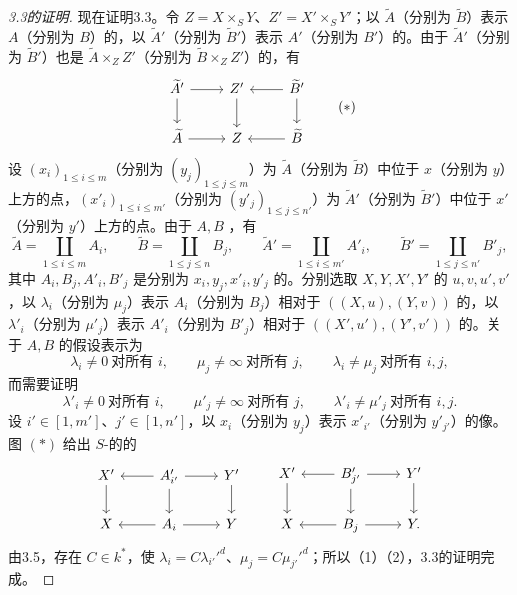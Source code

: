 \begin{proof}[3.3的证明]
现在证明3.3。令 $Z=X\times_S Y$、$Z'=X'\times_S Y'$；以 $\widetilde A$（分别为 $\widetilde B$）表示 $A$（分别为 $B$）的，以 $\widetilde A'$（分别为 $\widetilde B'$）表示 $A'$（分别为 $B'$）的。由于 $\widetilde A'$（分别为 $\widetilde B'$）也是 $\widetilde A\times_Z Z'$（分别为 $\widetilde B\times_Z Z'$）的，有
\[
\begin{tikzcd}
 \widetilde A'\arrow[r]\arrow[d]&Z'\arrow[d]&\widetilde B'\arrow[l]\arrow[d]\\
 \widetilde A\arrow[r]&Z&\widetilde B\arrow[l]
\end{tikzcd}\tag{$*$}
\]
设 $(x_i)_{1\leq i\leq m}$（分别为 $(y_j)_{1\leq j\leq m}$）为 $\widetilde A$（分别为 $\widetilde B$）中位于 $x$（分别为 $y$）上方的点，$(x'_i)_{1\leq i\leq m'}$（分别为 $(y'_j)_{1\leq j\leq n'}$）为 $\widetilde A'$（分别为 $\widetilde B'$）中位于 $x'$（分别为 $y'$）上方的点。由于 $A,B$ ，有
\[
 \widetilde A=\coprod_{1\leq i\leq m}A_i,\qquad
 \widetilde B=\coprod_{1\leq j\leq n}B_j,\qquad
 \widetilde A'=\coprod_{1\leq i\leq m'}A'_i,\qquad
 \widetilde B'=\coprod_{1\leq j\leq n'}B'_j,
\]
其中 $A_i,B_j,A'_i,B'_j$ 是分别为 $x_i,y_j,x'_i,y'_j$ 的。分别选取 $X,Y,X',Y'$ 的 $u,v,u',v'$，以 $\lambda_i$（分别为 $\mu_j$）表示 $A_i$（分别为 $B_j$）相对于 $((X,u),(Y,v))$ 的，以 $\lambda'_i$（分别为 $\mu'_j$）表示 $A'_i$（分别为 $B'_j$）相对于 $((X',u'),(Y',v'))$ 的。关于 $A,B$ 的假设表示为
\[
 \lambda_i\ne0\ \text{对所有 }i,\qquad
 \mu_j\ne\infty\ \text{对所有 }j,\qquad
 \lambda_i\ne\mu_j\ \text{对所有 }i,j,\tag{1}
\]
而需要证明
\[
 \lambda'_i\ne0\ \text{对所有 }i,\qquad
 \mu'_j\ne\infty\ \text{对所有 }j,\qquad
 \lambda'_i\ne\mu'_j\ \text{对所有 }i,j.\tag{2}
\]
设 $i'\in[1,m']$、$j'\in[1,n']$，以 $x_i$（分别为 $y_j$）表示 $x'_{i'}$（分别为 $y'_{j'}$）的像。图 $(*)$ 给出 $S$-的的
\[
\begin{tikzcd}
 X'\arrow[d]&A'_{i'}\arrow[l]\arrow[r]\arrow[d]&Y'\arrow[d]\\
 X&A_i\arrow[l]\arrow[r]&Y
\end{tikzcd}
\qquad
\begin{tikzcd}
 X'\arrow[d]&B'_{j'}\arrow[l]\arrow[r]\arrow[d]&Y'\arrow[d]\\
 X&B_j\arrow[l]\arrow[r]&Y.
\end{tikzcd}
\]
由3.5，存在 $C\in k^*$，使 $\lambda_i=C\lambda_{i'}'^d$、$\mu_j=C\mu_{j'}'^d$；所以（1）（2），3.3的证明完成。
\end{proof}

